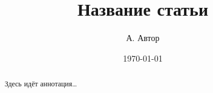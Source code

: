 \documentclass{article}
\title{Название статьи}
\author{А. Автор}
\date{\today}
\begin{document}
\maketitle
\begin{abstract}
Здесь идёт аннотация\dots
\end{abstract}
\end{document}
